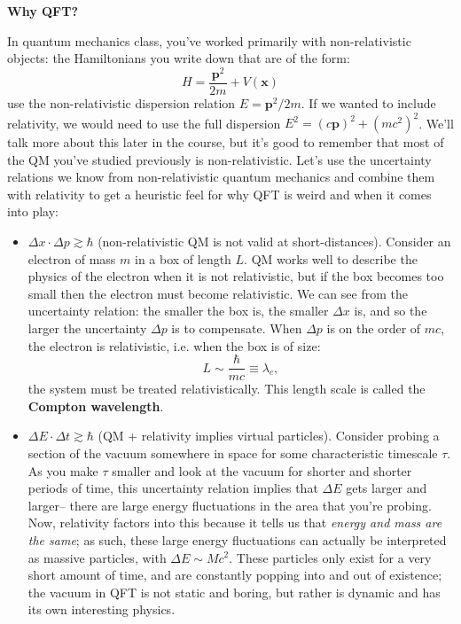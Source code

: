 \documentclass[12pt, oneside]{article}   	%
\theoremstyle{definition}
\begin{document}

\vspace{10mm}

\begin{answerbox}
{\centering \textbf{Why QFT?} } \\

\raggedright

In quantum mechanics class, you've worked primarily with non-relativistic objects: the Hamiltonians you write down that are of the form:
\begin{equation}
	H = \frac{\bm p^{2}}{2m} + V(\bm x)
\end{equation}
use the non-relativistic dispersion relation $E = \bm p^2 / 2m$. If we wanted to include relativity, we would need to use the full dispersion $E^2 = (c\bm p)^2 + (mc^2)^2$. We'll talk more about this later in the course, but it's good to remember that most of the QM you've studied previously is non-relativistic. Let's use the uncertainty relations we know from non-relativistic quantum mechanics and combine them with relativity to get a heuristic feel for why QFT is weird and when it comes into play:
\begin{itemize}
	\item $\Delta x \cdot \Delta p\gtrsim \hbar$ (non-relativistic QM is not valid at short-distances). Consider an electron of mass $m$ in a box of length $L$. QM works well to describe the physics of the electron when it is not relativistic, but if the box becomes too small then the electron must become relativistic. We can see from the uncertainty relation: the smaller the box is, the smaller $\Delta x$ is, and so the larger the uncertainty $\Delta p$ is to compensate. When $\Delta p$ is on the order of $mc$, the electron is relativistic, i.e. when the box is of size:
\begin{equation}
	L \sim \frac{\hbar}{mc}\equiv \lambda_c,
	\label{eq:compton}
\end{equation}
the system must be treated relativistically. This length scale is called the \textbf{Compton wavelength}.
	
	\item $\Delta E\cdot \Delta t\gtrsim\hbar$ (QM + relativity implies virtual particles). Consider probing a section of the vacuum somewhere in space for some characteristic timescale $\tau$. As you make $\tau$ smaller and look at the vacuum for shorter and shorter periods of time, this uncertainty relation implies that $\Delta E$ gets larger and larger-- there are large energy fluctuations in the area that you're probing. Now, relativity factors into this because it tells us that \textit{energy and mass are the same}; as such, these large energy fluctuations can actually be interpreted as massive particles, with $\Delta E\sim Mc^2$. These particles only exist for a very short amount of time, and are constantly popping into and out of existence; the vacuum in QFT is not static and boring, but rather is dynamic and has its own interesting physics. 
	

\end{itemize}
\end{answerbox}
\end{document}

